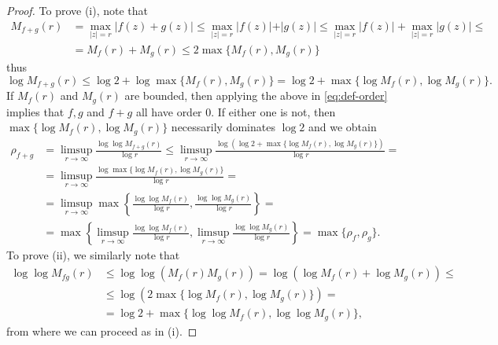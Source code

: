 \begin{proof}
    To prove (i), note that
    \begin{align*}
        M_{f+g}(r) &= \max_{\vert z \vert = r} \vert f(z) + g(z) \vert \leq \max_{\vert z \vert = r} \vert f(z) \vert + \vert g(z) \vert \leq \max_{\vert z \vert = r} \vert f(z) \vert + \max_{\vert z \vert = r} \vert g(z) \vert \leq \\
        &= M_f(r) + M_g(r) \leq 2 \max \{ M_f(r), M_g(r) \}
    \end{align*}
    thus
    $$ \log M_{f+g}(r) \leq \log 2 + \log \max \{ M_f(r), M_g(r) \} = \log 2 + \max \{ \log M_f(r), \log M_g(r) \}. $$
    If $M_f(r)$ and $M_g(r)$ are bounded, then applying the above in \cref{eq:def-order} implies that $f, g$ and $f+g$ all have order $0$. If either one is not, then $\max \{ \log M_f(r), \log M_g(r) \}$ necessarily dominates $\log 2$ and we obtain
    \begin{align*}
        \rho_{f+g} &= \limsup_{r \to \infty} \frac{\log \log M_{f+g}(r)}{\log r} \leq \limsup_{r \to \infty} \frac{\log (\log 2 + \max \{ \log M_f(r), \log M_g(r) \})}{\log r} = \\
        &= \limsup_{r \to \infty} \frac{\log \max \{ \log M_f(r), \log M_g(r) \}}{\log r} = \\
        &= \limsup_{r \to \infty} \max \left\{ \frac{\log \log M_f(r)}{\log r}, \frac{\log \log M_g(r)}{\log r} \right\} = \\
        &= \max \left\{ \limsup_{r \to \infty} \frac{\log \log M_f(r)}{\log r}, \limsup_{r \to \infty} \frac{\log \log M_g(r)}{\log r} \right\} = \max \{ \rho_f, \rho_g \}.
    \end{align*}
    To prove (ii), we similarly note that
    \begin{align*}
        \log \log M_{fg}(r) &\leq \log \log ( M_f(r) M_g(r) ) = \log (\log M_f(r) + \log M_g(r)) \leq \\
        &\leq \log (2 \max \{ \log M_f(r), \log M_g(r) \}) = \\
        &= \log 2 + \max \{ \log \log M_f(r), \log \log M_g(r) \},
    \end{align*}
    from where we can proceed as in (i).
\end{proof}



